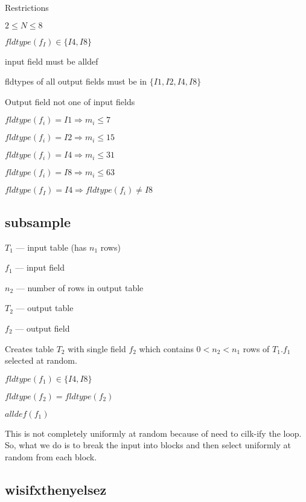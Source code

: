 \documentclass{report}
\begin{document}
Restrictions
\be
\item \(2 \leq N \leq 8 \)
\item \(fldtype(f_I) \in \{I4, I8\}\)
\item input field must be alldef
\item fldtypes of all output fields must be in \(\{I1, I2, I4, I8\}\)
\item Output field not one of input fields
\item \(fldtype(f_i) = I1 \Rightarrow m_i \leq 7\)
\item \(fldtype(f_i) = I2 \Rightarrow m_i \leq 15\)
\item \(fldtype(f_i) = I4 \Rightarrow m_i \leq 31\)
\item \(fldtype(f_i) = I8 \Rightarrow m_i \leq 63\)
\item \(fldtype(f_I) = I4 \Rightarrow fldtype(f_i) \neq I8\)
\ee


\subsection{subsample}
\label{subsample}

\be
\item \(T_1\) --- input table (has \(n_1\) rows)
\item \(f_1\) --- input field 
\item \(n_2\) --- number of rows in output table
\item \(T_2\) --- output table
\item \(f_2\) --- output field 
\ee

Creates table \(T_2\) with single field \(f_2\) which contains \(0 < n_2 <
n_1\) rows of \(T_1.f_1\) selected at random. 
\be
\item \(fldtype(f_1) \in \{ I4, I8\}\)
\item \(fldtype(f_2) = fldtype(f_2)\)
\item \(alldef(f_1)\)
\item This is not completely uniformly at random because of need to
cilk-ify the loop. So, what we do is to break the input into blocks and
then select uniformly at random from each block.
\ee

%
\subsection{wisifxthenyelsez}
\label{wisifxthenyelsez}
\end{document}
